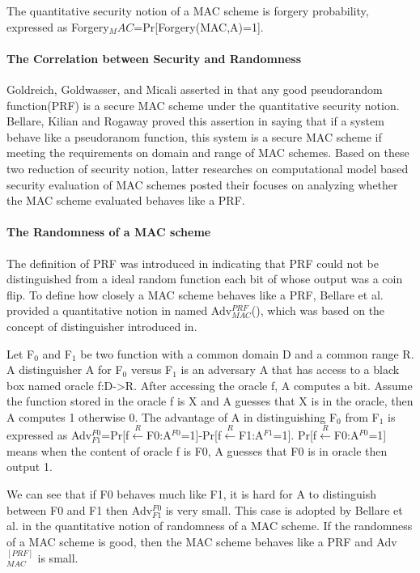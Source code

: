 \documentclass{article}
\begin{document}
The quantitative security notion of a MAC scheme is forgery probability, expressed as Forgery$_MAC$=Pr[Forgery(MAC,A)=1].
\paragraph{The Correlation between Security and Randomness}
Goldreich, Goldwasser, and Micali asserted in \cite{prf} that any good
pseudorandom function(PRF) is a secure MAC scheme under the quantitative
security notion. Bellare, Kilian and Rogaway proved this assertion in
\cite{cbc1994} saying that if a system behave like a pseudoranom function, this
system is a secure MAC scheme if meeting the requirements on domain and range of
MAC schemes. Based on these two reduction of security notion, latter researches
on computational model based security evaluation of MAC schemes posted their focuses on analyzing whether the MAC scheme evaluated behaves like a PRF.
\paragraph{The Randomness of a MAC scheme}
The definition of PRF was introduced in \cite{prf} indicating that PRF could not be distinguished from a ideal random function each bit of whose output was a coin flip. To define how closely a MAC scheme behaves like a PRF, Bellare et al. provided a quantitative notion in \cite{cbc1994} named Adv$^{PRF}_{MAC}$(), which was based on the concept of distinguisher introduced in\cite{prf}. 

Let F$_0$ and F$_1$ be two function with a common domain D and a common range R. A distinguisher A for F$_0$ versus F$_1$ is an adversary A that has access to a black box named oracle f:D->R. After accessing the oracle f, A computes a bit. Assume the function stored in the oracle f is X and A guesses that X is in the oracle, then A computes 1 otherwise 0. The advantage of A in distinguishing F$_0$ from F$_1$ is expressed as Adv$^{F0}_{F1}$=Pr[f$\stackrel{R}{\longleftarrow}$F0:A$^{F0}$=1]-Pr[f$\stackrel{R}{\longleftarrow}$F1:A$^{F1}$=1]. Pr[f$\stackrel{R}{\longleftarrow}$F0:A$^{F0}$=1] means when the content of oracle f is F0, A guesses that F0 is in oracle then output 1.

We can see that if F0 behaves much like F1, it is hard for A to distinguish between F0 and F1 then Adv$^{F0}_{F1}$ is very small. This case is adopted by Bellare et al. in the quantitative notion of randomness of a MAC scheme. If the randomness of a MAC scheme is good, then the MAC scheme behaves like a PRF and Adv$^{[PRF]}_{MAC}$ is small. 
\end{document}
